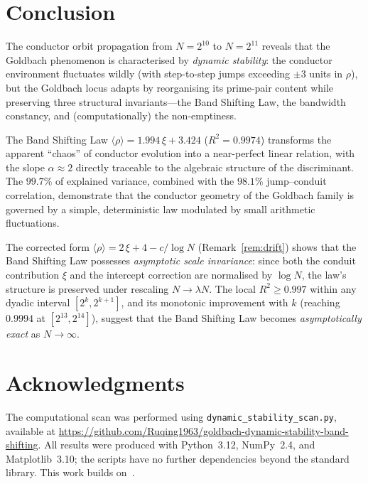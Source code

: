 \documentclass[11pt,a4paper]{article}
\theoremstyle{definition}
\begin{document}
\section{Conclusion}

The conductor orbit propagation from $N = 2^{10}$ to $N = 2^{11}$ reveals that
the Goldbach phenomenon is characterised by \emph{dynamic stability}: the
conductor environment fluctuates wildly (with step-to-step jumps exceeding
$\pm 3$ units in $\rho$), but the Goldbach locus adapts by reorganising its
prime-pair content while preserving three structural invariants---the Band Shifting
Law, the bandwidth constancy, and (computationally) the non-emptiness.

The Band Shifting Law
$\langle\rho\rangle = 1.994\,\xi + 3.424$ ($R^2 = 0.9974$) transforms the
apparent ``chaos'' of conductor evolution into a near-perfect linear relation,
with the slope $\alpha \approx 2$ directly traceable to the algebraic structure
of the discriminant.  The $99.7\%$ of explained variance, combined with the
$98.1\%$ jump--conduit correlation, demonstrate that the conductor geometry of
the Goldbach family is governed by a simple, deterministic law modulated by
small arithmetic fluctuations.

The corrected form $\langle\rho\rangle = 2\,\xi + 4 - c/\log N$ (Remark~\ref{rem:drift})
shows that the Band Shifting Law possesses \emph{asymptotic scale invariance}:
since both the conduit contribution $\xi$ and the intercept correction are
normalised by $\log N$, the law's structure is preserved under rescaling
$N \to \lambda N$.  The local $R^2 \geq 0.997$ within any dyadic interval
$[2^k, 2^{k+1}]$, and its monotonic improvement with $k$ (reaching $0.9994$
at $[2^{13}, 2^{14}]$), suggest that the Band Shifting Law becomes
\emph{asymptotically exact} as $N \to \infty$.


\section*{Acknowledgments}

The computational scan was performed using \texttt{dynamic\_stability\_scan.py},
available at
\url{https://github.com/Ruqing1963/goldbach-dynamic-stability-band-shifting}.
All results were produced with Python~3.12, NumPy~2.4, and Matplotlib~3.10;
the scripts have no further dependencies beyond the standard library.
This work builds on~\cite{Chen2026GM,Chen2026GMII,Chen2026AV}.
\end{document}
